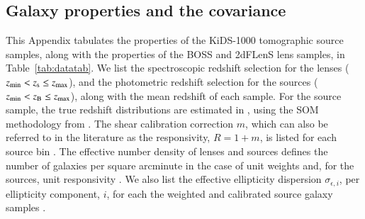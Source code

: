 \begin{appendix} 
\section{Galaxy properties and the \tttp covariance}
\label{app:properties}

This Appendix tabulates the properties of the KiDS-1000 tomographic source samples, along with the properties of the BOSS and 2dFLenS lens samples, in Table~\ref{tab:datatab}.   
We list the spectroscopic redshift selection for the lenses ($z_{\rm min} < z_{\rm s} \leq z_{\rm max}$), and the photometric redshift selection for the sources ($z_{\rm min} < z_{\rm B} \leq z_{\rm max}$), along with the mean redshift of each sample.  
For the source sample, the true redshift distributions are estimated in \citet{hildebrandt/etal:inprep}, using the SOM methodology from \citet{wright/etal:2020}.     
The shear calibration correction $m$, which can also be referred to in the literature as the responsivity, $R = 1+m$, is listed for each source bin \citep{kannawadi/etal:2019}.  
The effective number density of lenses and sources defines the number of galaxies per square arcminute in the case of unit weights and, for the sources, unit responsivity \citep[see equations C.11 and C.13 in][]{joachimi/etal:inprep}.  
We also list the effective ellipticity dispersion $\sigma_{\epsilon,i}$, per ellipticity component, $i$, for each the weighted and calibrated source galaxy samples \citep[equation C.8 in][]{joachimi/etal:inprep}.


\end{appendix}
